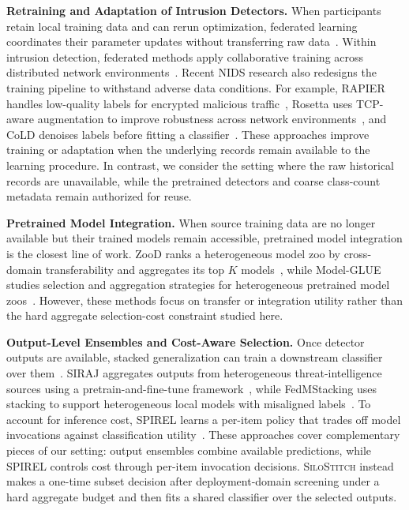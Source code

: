\documentclass[conference]{IEEEtran}
\theoremstyle{definition}
\newcommand{\Fname}{\textsc{SiloStitch}\xspace}
\newcommand{\bheading}[1]{\noindent\textbf{#1.}\xspace}
\begin{document}
\bheading{Retraining and Adaptation of Intrusion Detectors}
When participants retain local training data and can rerun optimization, federated learning coordinates their parameter updates without transferring raw data~\cite{federated_learning,Fedprox,ditto2021}.
Within intrusion detection, federated methods apply collaborative training across distributed network environments~\cite{pourahmadi2023fedoe,xu2026entente}.
Recent NIDS research also redesigns the training pipeline to withstand adverse data conditions.
For example, RAPIER handles low-quality labels for encrypted malicious traffic~\cite{qing2024rapier}, Rosetta uses TCP-aware augmentation to improve robustness across network environments~\cite{xie2023rosetta}, and CoLD denoises labels before fitting a classifier~\cite{yang2026cold}.
These approaches improve training or adaptation when the underlying records remain available to the learning procedure.
In contrast, we consider the setting where the raw historical records are unavailable, while the pretrained detectors and coarse class-count metadata remain authorized for reuse.

\bheading{Pretrained Model Integration}
When source training data are no longer available but their trained models remain accessible, pretrained model integration is the closest line of work.
ZooD ranks a heterogeneous model zoo by cross-domain transferability and aggregates its top $K$ models~\cite{dong2022zood}, while Model-GLUE studies selection and aggregation strategies for heterogeneous pretrained model zoos~\cite{zhao2024modelglue}.
However, these methods focus on transfer or integration utility rather than the hard aggregate selection-cost constraint studied here.

\bheading{Output-Level Ensembles and Cost-Aware Selection}
Once detector outputs are available, stacked generalization can train a
downstream classifier over them~\cite{wolpert1992stacked}.
SIRAJ aggregates outputs from heterogeneous threat-intelligence sources using a pretrain-and-fine-tune framework~\cite{thirumuruganathan2022siraj}, while FedMStacking uses stacking to support heterogeneous local models with misaligned labels~\cite{qiu2024fedmstacking}.
To account for inference cost, SPIREL learns a per-item policy that trades off model invocations against classification utility~\cite{birman2022spirel}.
These approaches cover complementary pieces of our setting: output ensembles combine available predictions, while SPIREL controls cost through per-item invocation decisions.
\Fname instead makes a one-time subset decision after deployment-domain screening under a hard aggregate budget and then fits a shared classifier over the selected outputs.
\end{document}
